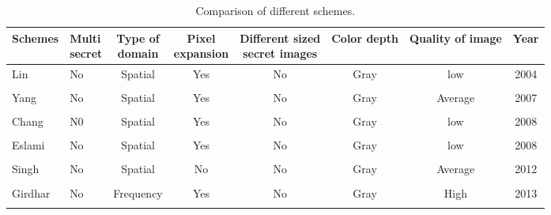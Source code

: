 \documentclass[12pt]{article}
\begin{document}
\begin{table}
\caption{Comparison of different schemes.}
\begin{adjustbox}{angle=45}
\begin{tabular}{|l||l||c||c||c||c||c||c}
\toprule
Schemes & \makecell{Multi\\secret} & \makecell{Type of\\domain} & \makecell{Pixel\\expansion} & \makecell{Different sized\\secret images} & Color depth  &  Quality of image  & Year \\ [1.5ex] \cline{2-5}
\midrule
Lin  &  No  &  Spatial & Yes & No & Gray &  low  & 2004\\ \\
Yang &  No  &  Spatial & Yes & No & Gray & Average & 2007 \\ \\
Chang & N0 & Spatial  & Yes & No & Gray & low & 2008 \\\\
Eslami & No & Spatial & Yes & No & Gray & low & 2008\\ \\
Singh  & No & Spatial & No  & No & Gray & Average & 2012\\ \\
Girdhar & No & Frequency & Yes & No & Gray & High & 2013 \\ \\
\bottomrule
\end{tabular}
\end{adjustbox}
\end{table}
\end{document}
